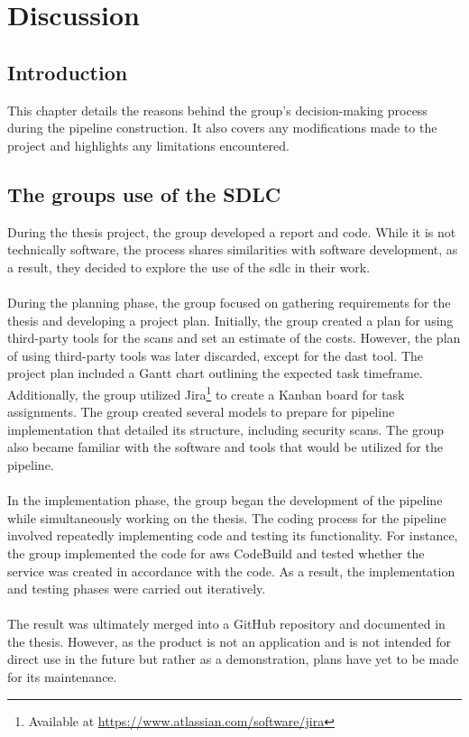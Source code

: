 \newpage
\thispagestyle{empty}
\mbox{}

\chapter{Discussion}
\section{Introduction}
This chapter details the reasons behind the group's decision-making process during the pipeline construction. It also covers any modifications made to the project and highlights any limitations encountered.

\section{The groups use of the SDLC} %
During the thesis project, the group developed a report and code. While it is not technically software, the process shares similarities with software development, as a result, they decided to explore the use of the \acrshort{sdlc} in their work. 
\\~\\
During the planning phase, the group focused on gathering requirements for the thesis and developing a project plan. Initially, the group created a plan for using third-party tools for the scans and set an estimate of the costs. However, the plan of using third-party tools was later discarded, except for the \acrshort{dast} tool. The project plan included a Gantt chart outlining the expected task timeframe. Additionally, the group utilized Jira\footnote{Available at \url{https://www.atlassian.com/software/jira}} to create a Kanban board for task assignments. The group created several models to prepare for pipeline implementation that detailed its structure, including security scans. The group also became familiar with the software and tools that would be utilized for the pipeline.
\\~\\
In the implementation phase, the group began the development of the pipeline while simultaneously working on the thesis. The coding process for the pipeline involved repeatedly implementing code and testing its functionality. For instance, the group implemented the code for \acrshort{aws} CodeBuild and tested whether the service was created in accordance with the code. As a result, the implementation and testing phases were carried out iteratively.
\\~\\
The result was ultimately merged into a GitHub repository and documented in the thesis. However, as the product is not an application and is not intended for direct use in the future but rather as a demonstration, plans have yet to be made for its maintenance. 

